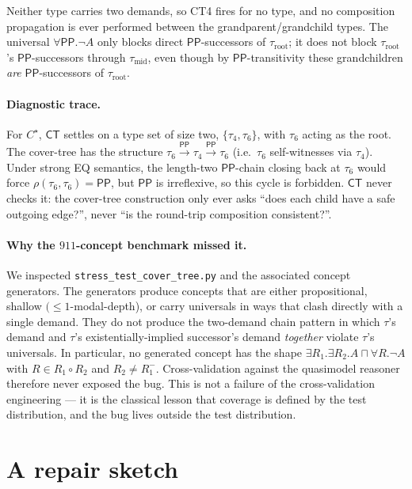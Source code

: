 \documentclass[]{ceurart}
\newcommand{\PP}{\mathsf{PP}}
\newcommand{\comp}{\circ}
\newcommand{\inv}[1]{#1^{-}}
\theoremstyle{definition}
\theoremstyle{remark}
\begin{document}
Neither type carries two demands, so CT4 fires for no type, and no
composition propagation is ever performed between the
grandparent/grandchild types.  The universal $\forall \PP . \neg A$
only blocks direct $\PP$-successors of $\tau_{\mathrm{root}}$; it
does not block $\tau_{\mathrm{root}}$'s $\PP$-successors through
$\tau_{\mathrm{mid}}$, even though by $\PP$-transitivity these
grandchildren \emph{are} $\PP$-successors of $\tau_{\mathrm{root}}$.

\paragraph{Diagnostic trace.}
For $C^{\star}$, $\mathsf{CT}$ settles on a type set of size two,
$\{\tau_4, \tau_6\}$, with $\tau_6$ acting as the root. The cover-tree
has the structure $\tau_6 \overset{\PP}{\longrightarrow} \tau_4
\overset{\PP}{\longrightarrow} \tau_6$ (i.e.~$\tau_6$ self-witnesses
via $\tau_4$). Under strong EQ semantics, the length-two $\PP$-chain
closing back at $\tau_6$ would force $\rho(\tau_6, \tau_6) = \PP$, but
$\PP$ is irreflexive, so this cycle is forbidden. $\mathsf{CT}$ never
checks it: the cover-tree construction only ever asks ``does each
child have a safe outgoing edge?'', never ``is the round-trip
composition consistent?''.

\paragraph{Why the $911$-concept benchmark missed it.}  We inspected
\verb|stress_test_cover_tree.py| and the associated concept
generators. The generators produce concepts that are either
propositional, shallow $(\leq 1$-modal-depth), or carry universals in
ways that clash directly with a single demand. They do not produce
the two-demand chain pattern in which
$\tau$'s demand and $\tau$'s existentially-implied successor's demand
\emph{together} violate $\tau$'s universals.  In particular, no
generated concept has the shape $\exists R_1 . \exists R_2 . A \sqcap
\forall R . \neg A$ with $R \in R_1 \comp R_2$ and $R_2 \neq
\inv{R_1}$. Cross-validation against the quasimodel reasoner therefore
never exposed the bug. This is not a failure of the cross-validation
engineering --- it is the classical lesson that coverage is defined by
the test distribution, and the bug lives outside the test
distribution.

\section{A repair sketch}
\label{sec:repair}
\end{document}
